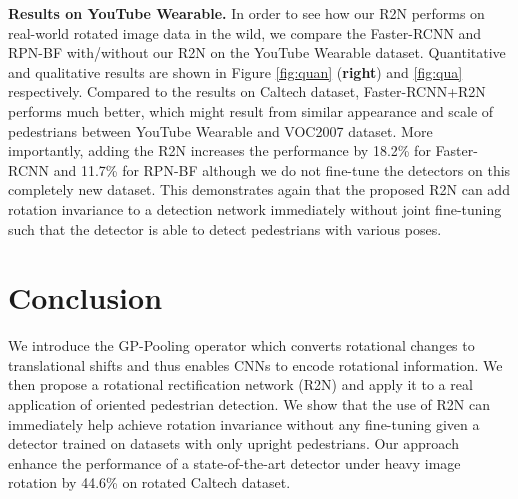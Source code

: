 \documentclass[10pt,twocolumn,letterpaper]{article}
\begin{document}
\noindent\textbf{Results on YouTube Wearable.} In order to see how our R2N performs on real-world rotated image data in the wild, we compare the Faster-RCNN and RPN-BF with/without our R2N on the YouTube Wearable dataset. Quantitative and qualitative results are shown in Figure \ref{fig:quan} (\textbf{right}) and \ref{fig:qua} respectively. Compared to the results on Caltech dataset, Faster-RCNN+R2N performs much better, which might result from similar appearance and scale of pedestrians between YouTube Wearable and VOC2007 dataset. 
More importantly, adding the R2N increases the performance by 18.2\% for Faster-RCNN and 11.7\% for RPN-BF although we do not fine-tune the detectors on this completely new dataset. 
This demonstrates again that the proposed R2N can add rotation invariance to a detection network immediately without joint fine-tuning such that the detector is able to detect pedestrians with various poses. 





\section{Conclusion}

We introduce the GP-Pooling operator which converts rotational changes to translational shifts and thus enables CNNs to encode rotational information. We then propose a rotational rectification network (R2N) and apply it to a real application of oriented pedestrian detection. We show that the use of R2N can immediately help achieve rotation invariance without any fine-tuning given a detector trained on datasets with only upright pedestrians. Our approach enhance the performance of a state-of-the-art detector under heavy image rotation by 44.6\% on rotated Caltech dataset.

{\small


}
\end{document}
